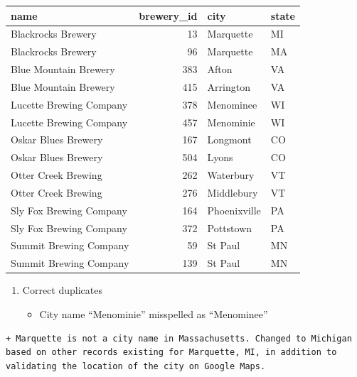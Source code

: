 \documentclass[]{article}
\newenvironment{Shaded}{\begin{snugshade}}{\end{snugshade}}
\newcommand{\KeywordTok}[1]{\textcolor[rgb]{0.13,0.29,0.53}{\textbf{#1}}}
\newcommand{\DataTypeTok}[1]{\textcolor[rgb]{0.13,0.29,0.53}{#1}}
\newcommand{\DecValTok}[1]{\textcolor[rgb]{0.00,0.00,0.81}{#1}}
\newcommand{\StringTok}[1]{\textcolor[rgb]{0.31,0.60,0.02}{#1}}
\newcommand{\CommentTok}[1]{\textcolor[rgb]{0.56,0.35,0.01}{\textit{#1}}}
\newcommand{\OperatorTok}[1]{\textcolor[rgb]{0.81,0.36,0.00}{\textbf{#1}}}
\newcommand{\NormalTok}[1]{#1}
\providecommand{\tightlist}{%
  \setlength{\itemsep}{0pt}\setlength{\parskip}{0pt}}
\begin{document}
\begin{longtable}[]{@{}lrll@{}}
\toprule
name & brewery\_id & city & state\tabularnewline
\midrule
\endhead
Blackrocks Brewery & 13 & Marquette & MI\tabularnewline
Blackrocks Brewery & 96 & Marquette & MA\tabularnewline
Blue Mountain Brewery & 383 & Afton & VA\tabularnewline
Blue Mountain Brewery & 415 & Arrington & VA\tabularnewline
Lucette Brewing Company & 378 & Menominee & WI\tabularnewline
Lucette Brewing Company & 457 & Menominie & WI\tabularnewline
Oskar Blues Brewery & 167 & Longmont & CO\tabularnewline
Oskar Blues Brewery & 504 & Lyons & CO\tabularnewline
Otter Creek Brewing & 262 & Waterbury & VT\tabularnewline
Otter Creek Brewing & 276 & Middlebury & VT\tabularnewline
Sly Fox Brewing Company & 164 & Phoenixville & PA\tabularnewline
Sly Fox Brewing Company & 372 & Pottstown & PA\tabularnewline
Summit Brewing Company & 59 & St Paul & MN\tabularnewline
Summit Brewing Company & 139 & St Paul & MN\tabularnewline
\bottomrule
\end{longtable}

\begin{enumerate}
\def\labelenumi{\arabic{enumi})}
\setcounter{enumi}{3}
\item
  Correct duplicates

  \begin{itemize}
  \tightlist
  \item
    City name ``Menominie'' misspelled as ``Menominee''
  \end{itemize}
\end{enumerate}

\begin{Shaded}
\end{Shaded}

\begin{verbatim}
+ Marquette is not a city name in Massachusetts. Changed to Michigan based on other records existing for Marquette, MI, in addition to validating the location of the city on Google Maps.
\end{verbatim}
\end{document}

